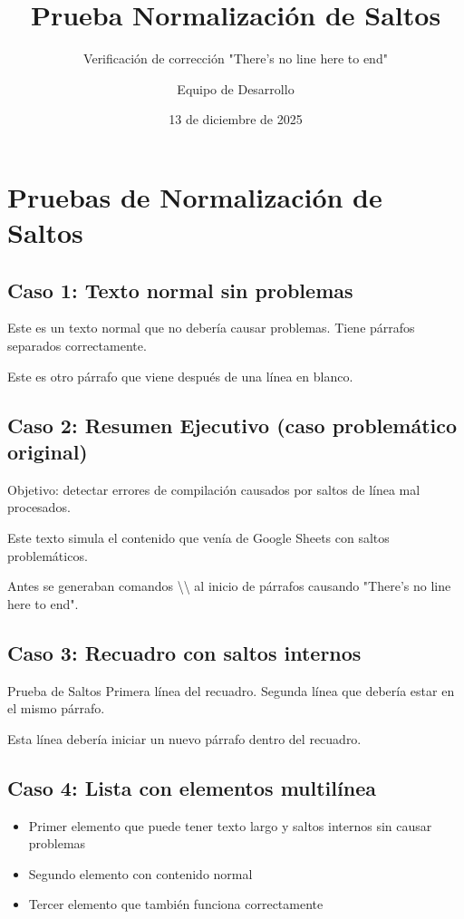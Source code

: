 \documentclass{sener2025}
\title{Prueba Normalización de Saltos}
\subtitle{Verificación de corrección "There's no line here to end"}
\author{Equipo de Desarrollo}
\date{13 de diciembre de 2025}
\begin{document}
\portadafondo

\tableofcontents
\newpage

\section{Pruebas de Normalización de Saltos}

\subsection{Caso 1: Texto normal sin problemas}

Este es un texto normal que no debería causar problemas. Tiene párrafos separados correctamente.

Este es otro párrafo que viene después de una línea en blanco.

\subsection{Caso 2: Resumen Ejecutivo (caso problemático original)}

\begin{resumenejecutivo}
Objetivo: detectar errores de compilación causados por saltos de línea mal procesados.

Este texto simula el contenido que venía de Google Sheets con saltos problemáticos.

Antes se generaban comandos \textbackslash\textbackslash{} al inicio de párrafos causando "There's no line here to end".
\end{resumenejecutivo}

\subsection{Caso 3: Recuadro con saltos internos}

\begin{recuadro}{Prueba de Saltos}
Primera línea del recuadro.
Segunda línea que debería estar en el mismo párrafo.

Esta línea debería iniciar un nuevo párrafo dentro del recuadro.
\end{recuadro}

\subsection{Caso 4: Lista con elementos multilínea}

\begin{itemize}
  \item Primer elemento que puede tener texto largo y saltos internos sin causar problemas
  \item Segundo elemento con contenido normal
  \item Tercer elemento que también funciona correctamente
\end{itemize}
\end{document}
